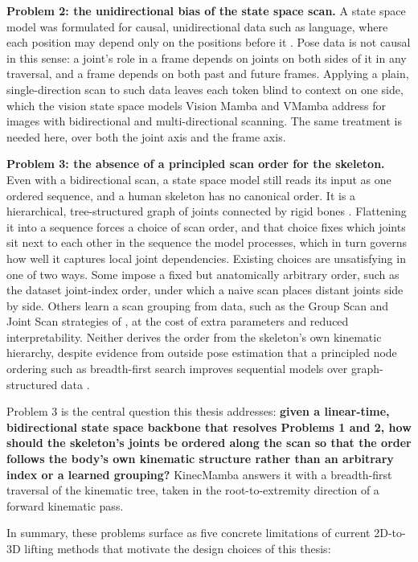 \textbf{Problem 2: the unidirectional bias of the state space scan.} A state
space model was formulated for causal, unidirectional data such as language,
where each position may depend only on the positions before it
\cite{gu2023mamba}. Pose data is not causal in this sense: a joint's role in
a frame depends on joints on both sides of it in any traversal, and a frame
depends on both past and future frames. Applying a plain, single-direction
scan to such data leaves each token blind to context on one side, which the
vision state space models Vision Mamba \cite{zhu2024visionmamba} and VMamba
\cite{liu2024vmamba} address for images with bidirectional and
multi-directional scanning. The same treatment is needed here, over both the
joint axis and the frame axis.

\textbf{Problem 3: the absence of a principled scan order for the skeleton.}
Even with a bidirectional scan, a state space model still reads its input as
one ordered sequence, and a human skeleton has no canonical order. It is a
hierarchical, tree-structured graph of joints connected by rigid bones
\cite{loper2015smpl}. Flattening it into a sequence forces a choice of scan
order, and that choice fixes which joints sit next to each other in the
sequence the model processes, which in turn governs how well it captures
local joint dependencies. Existing choices are unsatisfying in one of two
ways. Some impose a fixed but anatomically arbitrary order, such as the
dataset joint-index order, under which a naive scan places distant joints
side by side. Others learn a scan grouping from data, such as the Group Scan
and Joint Scan strategies of \cite{nguyen2025skeletonmamba}, at the cost of
extra parameters and reduced interpretability. Neither derives the order from
the skeleton's own kinematic hierarchy, despite evidence from outside pose
estimation that a principled node ordering such as breadth-first search
improves sequential models over graph-structured data \cite{you2018graphrnn}.

Problem 3 is the central question this thesis addresses: \textbf{given a
linear-time, bidirectional state space backbone that resolves Problems 1 and
2, how should the skeleton's joints be ordered along the scan so that the
order follows the body's own kinematic structure rather than an arbitrary
index or a learned grouping?} KinecMamba answers it with a breadth-first
traversal of the kinematic tree, taken in the root-to-extremity direction of a
forward kinematic pass.

In summary, these problems surface as five concrete limitations of current
2D-to-3D lifting methods that motivate the design choices of this thesis:

